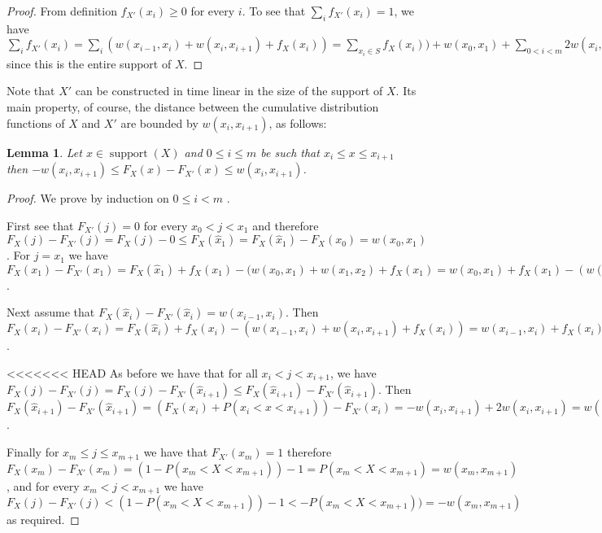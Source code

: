 \documentclass{article}
\newtheorem{lemma}[thm]{Lemma}
\DeclareMathOperator{\support}{support}
\begin{document}
	\begin{proof}
		From definition $f_{X'}(x_{i})\geq 0$ for every $i$. To see that $\sum_i f_{X'}(x_{i}) =1$, 
		we have $\sum_i f_{X'}(x_{i}) = \sum_i (w(x_{i-1},x_i) + w(x_i,x_{i+1}) + f_{X}(x_i)) = 	
		\sum _{x_i\in S} f_{X}(x_i)) + w(x_0,x_1)+ \sum_{0 < i < m} 2 w(x_i,x_{i+1}) + w(x_m,x_{m+1}) = 
		\sum _{x_i\in S} P(X{=}x_i) + P(x_0 {<} X {<} x_1)+ \sum_{0 < i < m} P(x_i < X < x_{i+1}) +P(x_m < X < x_{m+1}) = 1$ since this is the entire support of $X$.	
	\end{proof}
	
	
	Note that $X'$ can be constructed in time linear in the size of the support of $X$. %
	Its main property, of course, the distance between the cumulative distribution functions of $X$ and $X'$ are bounded by $w(x_i,x_{i+1})$, as follows:
	\begin{lemma}\label{lem:balance}
		Let $x\in\support(X)$ and $0\leq i\leq m$ be such that $x_i\leq x \leq x_{i+1}$ then $-w(x_i,x_{i+1})\leq F_X(x)-F_{X'}(x)\leq  w(x_i,x_{i+1})$.
	\end{lemma}
	
	\begin{proof}	
		
		We prove by induction on $0\leq i < m$ .
		
		First see that $F_{X'}(j) = 0$  for every $x_0<j < x_1$ and therefore $F_X(j)-F_{X'}(j) = F_X(j)-0 \leq F_X(\hat x_1)= F_X(\hat x_1)- F_X(x_0) = w(x_0,x_1)$. For $ j = x_1$ we have $F_X(x_1)-F_{X'}(x_1)=  F_X(\hat x_1) +f_{X}(x_1) - (w(x_0,x_1) + w(x_1,x_2) + f_{X}(x_1) = 
		w(x_0,x_1) +f_{X}(x_1) - (w(x_0,x_1) + w(x_1,x_2) + f_{X}(x_1)) = -w(x_1,x_2)$.
		
		Next assume that $F_X(\hat x_i)-F_{X'}(\hat x_i) = w(x_{i-1},x_i)$.
		Then $F_X(x_i)-F_{X'}(x_i) =  F_X(\hat x_i) +f_{X}(x_i) - (w(x_{i-1},x_i) + w(x_i,x_{i+1}) + f_{X}(x_i)) =  w(x_{i-1},x_i) +f_{X}(x_{i}) - (w(x_{i-1},x_i) + w(x_{i},x_{i+1}) + f_{X}(x_{i})) = -w(x_{i},x_{i+1})$.
		
<<<<<<< HEAD
		As before we have that for all $x_i< j< x_{i+1}$, we have $F_X(j)-F_{X'}(j) = F_X(j)-F_{X'}(\hat x_{i+1}) \leq  F_X(\hat x_{i+1})-F_{X'}(\hat x_{i+1})$. Then $F_X(\hat x_{i+1})-F_{X'}(\hat x_{i+1}) = (F_X(x_i)+ P(x_i < x <x_{i+1})) - F_{X'}(x_i) = -w(x_{i},x_{i+1}) + 2w(x_{i},x_{i+1}) = w(x_{i},x_{i+1}) $.
		
		
		Finally for $x_m\leq j \leq x_{m+1}$ we have that $F_{X'}(x_m)=1$ therefore $F_X(x_m)-F_{X'}(x_m) = (1- P(x_m<X < x_{m+1})) - 1 =  P(x_m<X < x_{m+1}) = w(x_m,x_{m+1})$, and for every $x_m<j<x_{m+1}$ we have $F_X(j) - F_{X'}(j) < (1- P(x_m<X < x_{m+1})) - 1 <  - P(x_m<X < x_{m+1}))  = -w(x_m,x_{m+1})$ as required.
	\end{proof}
	
\end{document}
